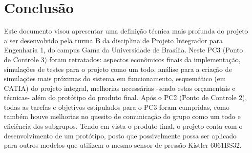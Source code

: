 \chapter{Conclusão}
 Este documento visou apresentar uma definição técnica mais profunda do projeto a ser desenvolvido pela turma B da disciplina de Projeto Integrador para Engenharia 1, do campus Gama da Universidade de Brasília. Neste PC3 (Ponto de Controle 3) foram retratados: aspectos econômicos finais da implementação, simulações de testes para o projeto como um todo, análise para a criação de simulações mais próximas do sistema em funcionamento, esquemático (em CATIA) do projeto integral, melhorias necessárias -sendo estas orçamentais e técnicas- além do protótipo do produto final. Após o PC2 (Ponto de Controle 2), todas as tarefas e objetivos estipulados para o PC3 foram cumpridas, como também houve melhorias no quesito de comunicação do grupo como um todo e eficiência dos subgrupos. Tendo em vista o produto final, o projeto conta com o desenvolvimento de um protótipo, posto que possivelmente possa ser aplicado para outros modelos que utilizem o mesmo sensor de pressão Kistler 6061BS32.  
